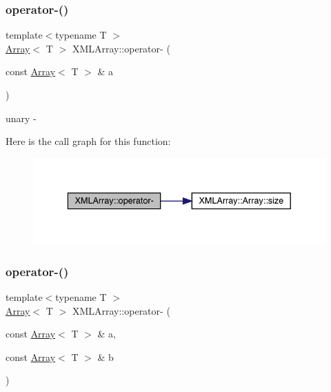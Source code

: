\subsubsection{\texorpdfstring{operator-\/()}{operator-()}\hspace{0.1cm}{\footnotesize\ttfamily [5/8]}}
{\footnotesize\ttfamily template$<$typename T $>$ \\
\mbox{\hyperlink{classXMLArray_1_1Array}{Array}}$<$ T $>$ X\+M\+L\+Array\+::operator-\/ (\begin{DoxyParamCaption}\item[{const \mbox{\hyperlink{classXMLArray_1_1Array}{Array}}$<$ T $>$ \&}]{a }\end{DoxyParamCaption})\hspace{0.3cm}{\ttfamily [inline]}}



unary -\/ 

Here is the call graph for this function\+:
\nopagebreak
\begin{figure}[H]
\begin{center}
\leavevmode
\includegraphics[width=336pt]{dd/db1/namespaceXMLArray_a1d51bbb3ee59a78dd9e705ecd3db1571_cgraph}
\end{center}
\end{figure}
\mbox{\label{namespaceXMLArray_ae8e0bb6934e99151ecdd65abfad39763}} 
\subsubsection{\texorpdfstring{operator-\/()}{operator-()}\hspace{0.1cm}{\footnotesize\ttfamily [6/8]}}
{\footnotesize\ttfamily template$<$typename T $>$ \\
\mbox{\hyperlink{classXMLArray_1_1Array}{Array}}$<$ T $>$ X\+M\+L\+Array\+::operator-\/ (\begin{DoxyParamCaption}\item[{const \mbox{\hyperlink{classXMLArray_1_1Array}{Array}}$<$ T $>$ \&}]{a,  }\item[{const \mbox{\hyperlink{classXMLArray_1_1Array}{Array}}$<$ T $>$ \&}]{b }\end{DoxyParamCaption})\hspace{0.3cm}{\ttfamily [inline]}}



